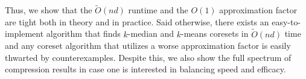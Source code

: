 Thus, we show that the $\tilde{O}(nd)$ runtime and the $O(1)$ approximation factor are tight both in theory and in practice.
Said otherwise, there exists an easy-to-implement algorithm that finds $k$-median and $k$-means coresets in $\tilde{O}(nd)$ time and any coreset
algorithm that utilizes a worse approximation factor is easily thwarted by counterexamples. Despite this, we also show the full spectrum of compression results
in case one is interested in balancing speed and efficacy.
